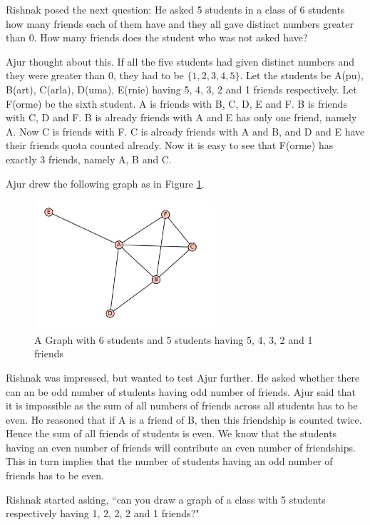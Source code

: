 Rishnak posed the next question: He asked 5 students in a class of 6 students how many friends each of them have and they all gave distinct numbers greater than 0. How many friends does the student who was not asked have?

Ajur thought about this. If all the five students had given distinct numbers and they were greater than 0, they had to be $\{1,2,3,4,5\}$. Let the students be A(pu), B(art), C(arla), D(uma), E(rnie) having 5, 4, 3, 2 and 1 friends respectively. Let F(orme) be the sixth student. A is friends with B, C, D, E and F. B is friends with C, D and F. B is already friends with A and E has only one friend, namely A. Now C is friends with F. C is already friends with A and B, and D and E have their friends quota counted already. 
Now it is easy to see that F(orme) has exactly 3 friends, namely A, B and C.

Ajur drew the following graph as in Figure \ref{dg2}.

\begin{figure}
\begin{center}
\includegraphics[width=0.6\textwidth]{graphstory1-1.JPG}
\caption{A Graph with 6 students and 5 students having 5, 4, 3, 2 and 1 friends}\label{dg2}
\end{center}
\end{figure}

Rishnak was impressed, but wanted to test Ajur further. He asked whether there can an be odd number of students having odd number of friends. Ajur said that it is impossible as the sum of all numbers of friends across all students has to be even. He reasoned that if A is a friend of B, then this friendship is counted twice. Hence the sum of all friends of students is even. We know that the students having an even number of friends will contribute an even number of friendships. This in turn implies that the number of students having an odd number of friends has to be even.


Rishnak started asking, ``can you draw a graph of a class with 5 students respectively having 1, 2, 2, 2 and 1 friends?"

